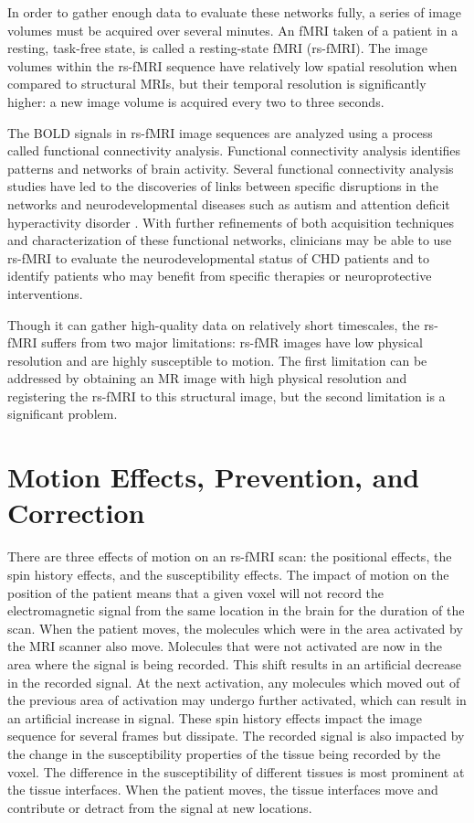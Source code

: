 In order to gather enough data to evaluate these networks fully, a series of image volumes must be acquired over several minutes. An fMRI taken of a patient in a resting, task-free state, is called a resting-state fMRI (rs-fMRI). The image volumes within the rs-fMRI sequence have relatively low spatial resolution when compared to structural MRIs, but their temporal resolution is significantly higher: a new image volume is acquired every two to three seconds. 

The BOLD signals in rs-fMRI image sequences are analyzed using a process called functional connectivity analysis. Functional connectivity analysis identifies patterns and networks of brain activity. Several functional connectivity analysis studies have led to the discoveries of links between specific disruptions in the networks and neurodevelopmental diseases such as autism and attention deficit hyperactivity disorder \cite{Assaf2010} \cite{Zang2007}. With further refinements of both acquisition techniques and characterization of these functional networks, clinicians may be able to use rs-fMRI to evaluate the neurodevelopmental status of CHD patients and to identify patients who may benefit from specific therapies or neuroprotective interventions.

Though it can gather high-quality data on relatively short timescales, the rs-fMRI suffers from two major limitations: rs-fMR images have low physical resolution and are highly susceptible to motion. The first limitation can be addressed by obtaining an MR image with high physical resolution and registering the rs-fMRI to this structural image, but the second limitation is a significant problem. 

\section{Motion Effects, Prevention, and Correction}

There are three effects of motion on an rs-fMRI scan: the positional effects, the spin history effects, and the susceptibility effects. The impact of motion on the position of the patient means that a given voxel will not record the electromagnetic signal from the same location in the brain for the duration of the scan. When the patient moves, the molecules which were in the area activated by the MRI scanner also move. Molecules that were not activated are now in the area where the signal is being recorded. This shift results in an artificial decrease in the recorded signal. At the next activation, any molecules which moved out of the previous area of activation may undergo further activated, which can result in an artificial increase in signal. These spin history effects impact the image sequence for several frames but dissipate. The recorded signal is also impacted by the change in the susceptibility properties of the tissue being recorded by the voxel. The difference in the susceptibility of different tissues is most prominent at the tissue interfaces. When the patient moves, the tissue interfaces move and contribute or detract from the signal at new locations. 

